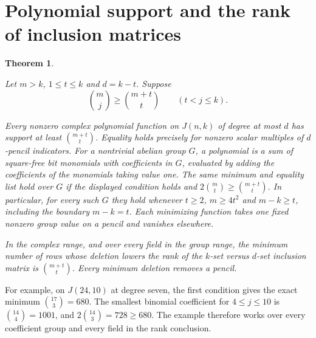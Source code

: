 \documentclass[11pt,letterpaper]{article}
\newtheorem{theorem}{Theorem}[section]
\numberwithin{equation}{section}
\begin{document}
\section{Polynomial support and the rank of inclusion matrices}\label{sec:rank}

\begin{theorem}\label{thm:rank}

Let $m>k$, $1\le t\le k$ and $d=k-t$. Suppose
\[
\binom mj\ge \binom{m+t}{t}\qquad(t<j\le k).
\]

Every nonzero complex polynomial function on $J(n,k)$ of degree at most $d$ has support at
least $\binom{m+t}{t}$. Equality holds precisely for nonzero scalar multiples of $d$-pencil
indicators. For a nontrivial abelian group $G$, a polynomial is a sum of square-free bit
monomials with coefficients in $G$, evaluated by adding the coefficients of the monomials
taking value one. The same minimum and equality list hold over $G$ if the displayed condition
holds and $2\binom mt\ge\binom{m+t}{t}$. In particular, for every such $G$ they hold whenever
$t\ge2$, $m\ge4t^2$ and $m-k\ge t$, including the boundary $m-k=t$. Each minimizing function
takes one fixed nonzero group value on a pencil and vanishes elsewhere.

In the complex range, and over every field in the group range, the minimum number of rows
whose deletion lowers the rank of the $k$-set versus $d$-set inclusion matrix is
$\binom{m+t}{t}$. Every minimum deletion removes a pencil.
\end{theorem}

For example, on $J(24,10)$ at degree seven, the first condition gives the exact minimum
$\binom{17}{3}=680$. The smallest binomial coefficient for $4\le j\le10$ is
$\binom{14}{4}=1001$, and $2\binom{14}{3}=728\ge680$. The example therefore works over every
coefficient group and every field in the rank conclusion.
\end{document}
